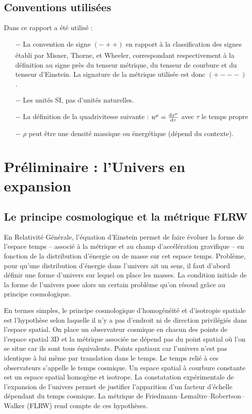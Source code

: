\documentclass[10pt, a4paper]{report}
\numberwithin{equation}{subsection}
\begin{document}


\subsection*{Conventions utilisées}

Dans ce rapport a été utilisé :
\begin{itemize}
	\item[$-$] La convention de signe $(-++)$ en rapport à la classification des signes établi par Misner, Thorne, et Wheeler\textsuperscript{\cite{Signes}}, correspondant respectivement à la définition au signe près du tenseur métrique, du tenseur de courbure et du tenseur d'Einstein. La signature de la métrique utilisée est donc $(+---)$.
	\item[$-$] Les unités SI, pas d'unités naturelles.
	\item[$-$] La définition de la quadrivitesse suivante : $u^\mu = \frac{{\rm d}x^\mu}{{\rm d}\tau}$ avec $\tau$ le temps propre
	\item[$-$] $\rho$ peut être une densité massique ou énergétique (dépend du contexte).
\end{itemize}



\section{Préliminaire : l'Univers en expansion}

\subsection{Le principe cosmologique et la métrique FLRW}
En Relativité Générale, l'équation d'Einstein permet de faire évoluer la forme de l'espace temps -- associé à la métrique et au champ d'accélération gravifique -- en fonction de la distribution d'énergie ou de masse sur cet espace temps. Problème, pour qu'une distribution d'énergie dans l'univers ait un sens, il faut d'abord définir une forme d'univers sur lequel on place les masses. La condition initiale de la forme de l'univers pose alors un certain problème qu'on résoud grâce au principe cosmologique.

En termes simples, le principe cosmologique d'homogénéité et d'isotropie spatiale est l'hypothèse selon laquelle il n'y a pas d'endroit ni de direction privilégiés dans l'espace spatial. On place un observateur cosmique en chacun des points de l'espace spatial 3D et la métrique associée ne dépend pas du point spatial où l'on se situe car ils sont tous équivalents. Points spatiaux car l'univers n'est pas identique à lui même par translation dans le temps. Le temps relié à ces observateurs s'appelle le temps cosmique. Un espace spatial à courbure constante est un espace spatial homogène et isotrope.  La constatation expérimentale de l'expansion de l'univers permet de justifier l'apparition d'un facteur d'échelle dépendant du temps cosmique. La métrique de Friedmann–Lemaître–Robertson–Walker (FLRW) rend compte de ces hypothèses.
\end{document}

